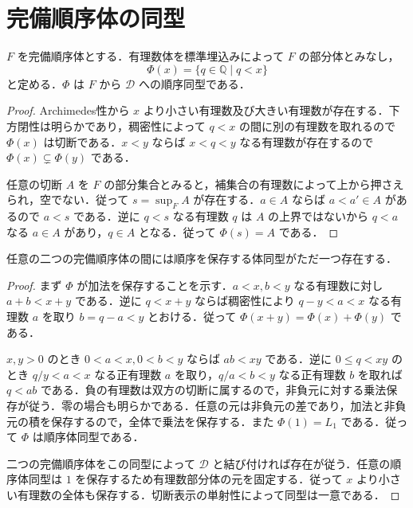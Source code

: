 \section{完備順序体の同型}
\begin{prop}[完備順序体の切断表示]
$F$ を完備順序体とする．有理数体を標準埋込みによって $F$ の部分体とみなし，
\[
 \Phi(x)=\{q\in\mathbb Q\mid q<x\}
\]
と定める．$\Phi$ は $F$ から $\mathcal D$ への順序同型である．
\end{prop}
\begin{proof}
Archimedes性から $x$ より小さい有理数及び大きい有理数が存在する．下方閉性は明らかであり，稠密性によって $q<x$ の間に別の有理数を取れるので $\Phi(x)$ は切断である．$x<y$ ならば $x<q<y$ なる有理数が存在するので $\Phi(x)\subsetneq\Phi(y)$ である．

任意の切断 $A$ を $F$ の部分集合とみると，補集合の有理数によって上から押さえられ，空でない．従って $s=\sup_F A$ が存在する．$a\in A$ ならば $a<a'\in A$ があるので $a<s$ である．逆に $q<s$ なる有理数 $q$ は $A$ の上界ではないから $q<a$ なる $a\in A$ があり，$q\in A$ となる．従って $\Phi(s)=A$ である．
\end{proof}
\begin{prop}[実数体の一意性]
任意の二つの完備順序体の間には順序を保存する体同型がただ一つ存在する．
\end{prop}
\begin{proof}
まず $\Phi$ が加法を保存することを示す．$a<x,b<y$ なる有理数に対し $a+b<x+y$ である．逆に $q<x+y$ ならば稠密性により $q-y<a<x$ なる有理数 $a$ を取り $b=q-a<y$ とおける．従って $\Phi(x+y)=\Phi(x)+\Phi(y)$ である．

$x,y>0$ のとき $0<a<x,0<b<y$ ならば $ab<xy$ である．逆に $0\leq q<xy$ のとき $q/y<a<x$ なる正有理数 $a$ を取り，$q/a<b<y$ なる正有理数 $b$ を取れば $q<ab$ である．負の有理数は双方の切断に属するので，非負元に対する乗法保存が従う．零の場合も明らかである．任意の元は非負元の差であり，加法と非負元の積を保存するので，全体で乗法を保存する．また $\Phi(1)=L_1$ である．従って $\Phi$ は順序体同型である．

二つの完備順序体をこの同型によって $\mathcal D$ と結び付ければ存在が従う．任意の順序体同型は $1$ を保存するため有理数部分体の元を固定する．従って $x$ より小さい有理数の全体も保存する．切断表示の単射性によって同型は一意である．
\end{proof}
